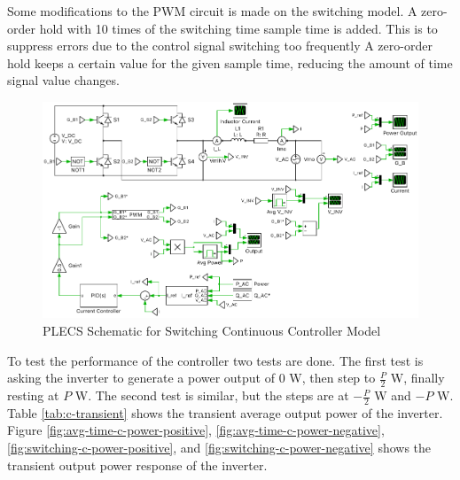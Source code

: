 \documentclass[12pt]{article}
\begin{document}
Some modifications to the PWM circuit is made on the switching model.
A zero-order hold with 10 times of the switching time sample time is added.
This is to suppress errors due to the control signal switching too frequently
A zero-order hold keeps a certain value for the given sample time, reducing the amount of time signal value changes.

\begin{figure}[ht]
    \centering{}
    \includegraphics[width=\textwidth, height=0.4\textheight, keepaspectratio]{img/Switching C Model.pdf}
    \caption{PLECS Schematic for Switching Continuous Controller Model}
    \label{fig:switching-c-model}
\end{figure}

To test the performance of the controller two tests are done.
The first test is asking the inverter to generate a power output of 0 W, then step to $\frac{P}{2}$ W, finally resting at $P$ W.
The second test is similar, but the steps are at $-\frac{P}{2}$ W and $-P$ W.
Table \ref{tab:c-transient} shows the transient average output power of the inverter.
Figure \ref{fig:avg-time-c-power-positive}, \ref{fig:avg-time-c-power-negative}, \ref{fig:switching-c-power-positive}, and \ref{fig:switching-c-power-negative} shows the transient output power response of the inverter.
\end{document}
